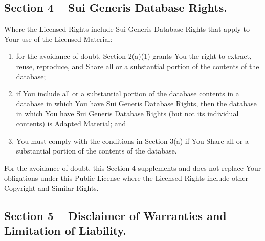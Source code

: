\subsection*{Section 4 -- Sui Generis Database Rights.}

Where the Licensed Rights include Sui Generis Database Rights that apply
to Your use of the Licensed Material:

\begin{enumerate}
\item
  for the avoidance of doubt, Section 2(a)(1) grants You the right to
  extract, reuse, reproduce, and Share all or a substantial portion of
  the contents of the database;
\item
  if You include all or a substantial portion of the database contents
  in a database in which You have Sui Generis Database Rights, then the
  database in which You have Sui Generis Database Rights (but not its
  individual contents) is Adapted Material;
  and
\item
  You must comply with the conditions in Section 3(a) if You Share all
  or a substantial portion of the contents of the database.
\end{enumerate}

For the avoidance of doubt, this Section 4 supplements and does not
replace Your obligations under this Public License where the Licensed
Rights include other Copyright and Similar Rights.

\subsection*{Section 5 -- Disclaimer of Warranties and Limitation of Liability.}

